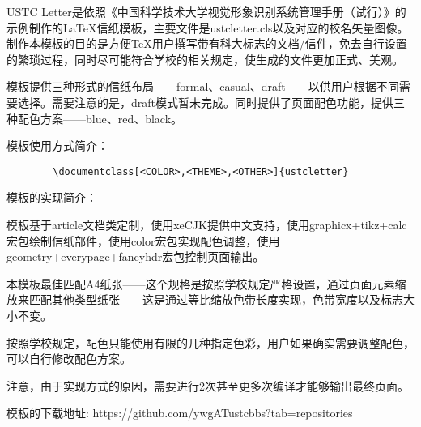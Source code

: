 \documentclass[blue,casual,12pt]{ustcletter}
\begin{document}
USTC Letter是依照《中国科学技术大学视觉形象识别系统管理手册（试行）》的示例制作的LaTeX信纸模板，主要文件是ustcletter.cls以及对应的校名矢量图像。制作本模板的目的是方便TeX用户撰写带有科大标志的文档/信件，免去自行设置的繁琐过程，同时尽可能符合学校的相关规定，使生成的文件更加正式、美观。

模板提供三种形式的信纸布局——formal、casual、draft——以供用户根据不同需要选择。需要注意的是，draft模式暂未完成。同时提供了页面配色功能，提供三种配色方案——blue、red、black。

模板使用方式简介：
\begin{verbatim}
        \documentclass[<COLOR>,<THEME>,<OTHER>]{ustcletter}
\end{verbatim}


模板的实现简介：

模板基于article文档类定制，使用xeCJK提供中文支持，使用graphicx+tikz+calc宏包绘制信纸部件，使用color宏包实现配色调整，使用geometry+everypage+fancyhdr宏包控制页面输出。

本模板最佳匹配A4纸张——这个规格是按照学校规定严格设置，通过页面元素缩放来匹配其他类型纸张——这是通过等比缩放色带长度实现，色带宽度以及标志大小不变。

按照学校规定，配色只能使用有限的几种指定色彩，用户如果确实需要调整配色，可以自行修改配色方案。

注意，由于实现方式的原因，需要进行2次甚至更多次编译才能够输出最终页面。

模板的下载地址:
https://github.com/ywgATustcbbs?tab=repositories

~

~

\lipsum[1-5]
\end{document}
